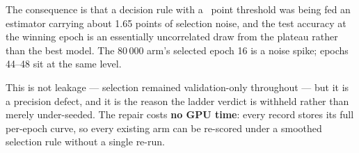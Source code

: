 The consequence is that a decision rule with a \SeedBand\ point threshold was being fed an estimator
carrying about 1.65 points of selection noise, and the test accuracy at the winning epoch is an
essentially uncorrelated draw from the plateau rather than the best model. The 80\,000 arm's selected
epoch 16 is a noise spike; epochs 44--48 sit at the same level.

This is not leakage --- selection remained validation-only throughout --- but it is a precision
defect, and it is the reason the ladder verdict is withheld rather than merely under-seeded. The
repair costs \textbf{no GPU time}: every record stores its full per-epoch curve, so every existing arm
can be re-scored under a smoothed selection rule without a single re-run.
